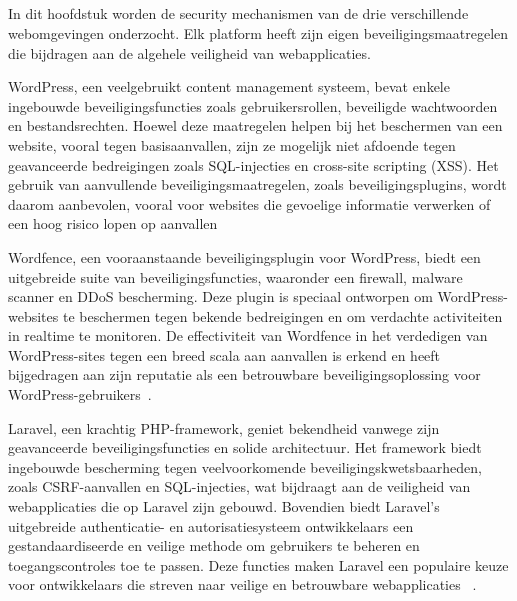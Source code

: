 \subsection{}
\label{sec:Security mechanismen in Webomgevingen}

In dit hoofdstuk worden de security mechanismen van de drie verschillende webomgevingen onderzocht. Elk platform heeft zijn eigen beveiligingsmaatregelen die bijdragen 
aan de algehele veiligheid van webapplicaties.

WordPress, een veelgebruikt content management systeem, bevat enkele ingebouwde beveiligingsfuncties zoals gebruikersrollen, beveiligde 
wachtwoorden en bestandsrechten. Hoewel deze maatregelen helpen bij het beschermen van een website, vooral tegen basisaanvallen, zijn ze 
mogelijk niet afdoende tegen geavanceerde bedreigingen zoals SQL-injecties en cross-site scripting (XSS). Het gebruik van aanvullende 
beveiligingsmaatregelen, zoals beveiligingsplugins, wordt daarom aanbevolen, vooral voor websites die gevoelige informatie verwerken 
of een hoog risico lopen op aanvallen~\autocite{Trunde2015}

Wordfence, een vooraanstaande beveiligingsplugin voor WordPress, biedt een uitgebreide suite van beveiligingsfuncties, waaronder een 
firewall, malware scanner en DDoS bescherming. Deze plugin is speciaal ontworpen om WordPress-websites te beschermen tegen bekende 
bedreigingen en om verdachte activiteiten in realtime te monitoren. De effectiviteit van Wordfence in het verdedigen van WordPress-sites 
tegen een breed scala aan aanvallen is erkend en heeft bijgedragen aan zijn reputatie als een betrouwbare beveiligingsoplossing voor 
WordPress-gebruikers~\autocite{277144}.

Laravel, een krachtig PHP-framework, geniet bekendheid vanwege zijn geavanceerde beveiligingsfuncties en solide architectuur. Het 
framework biedt ingebouwde bescherming tegen veelvoorkomende beveiligingskwetsbaarheden, zoals CSRF-aanvallen en SQL-injecties, wat 
bijdraagt aan de veiligheid van webapplicaties die op Laravel zijn gebouwd. Bovendien biedt Laravel's uitgebreide authenticatie- en 
autorisatiesysteem ontwikkelaars een gestandaardiseerde en veilige methode om gebruikers te beheren en toegangscontroles toe te passen. 
Deze functies maken Laravel een populaire keuze voor ontwikkelaars die streven naar veilige en betrouwbare webapplicaties
~\autocite{Adamu2020}.

